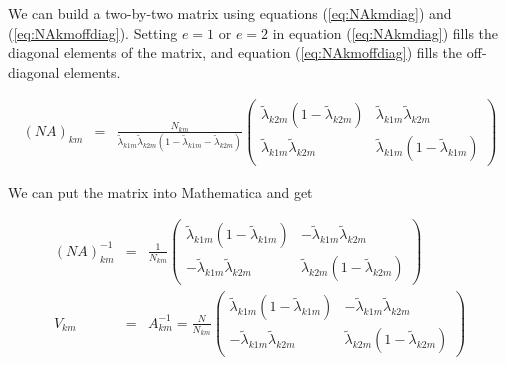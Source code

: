 \documentclass[11pt]{article}
\begin{document}
We can build a two-by-two matrix using equations (\ref{eq:NAkmdiag})
and (\ref{eq:NAkmoffdiag}).  Setting $e=1$ or $e=2$ in equation
(\ref{eq:NAkmdiag}) fills the diagonal elements of the matrix, and
equation (\ref{eq:NAkmoffdiag}) fills the off-diagonal elements. 



\begin{eqnarray}
(NA)_{km} & = &
                                 \frac{N_{km}}{ \tilde{\lambda}_{k1m} \tilde{\lambda}_{k2m} 
                                   (1-\tilde{\lambda}_{k1m}-\tilde{\lambda}_{k2m})
                                 }
                                 \left( \begin{array} {cc}
                                     \tilde{\lambda}_{k2m}(1-\tilde{\lambda}_{k2m}) & 
                                     \tilde{\lambda}_{k1m} \tilde{\lambda}_{k2m} \\
                                     \tilde{\lambda}_{k1m} \tilde{\lambda}_{k2m} &
                                     \tilde{\lambda}_{k1m}(1-\tilde{\lambda}_{k1m})
                                   \end{array} \right)
\end{eqnarray}

We can put the matrix into Mathematica and get 

\begin{eqnarray}
(NA)_{km}^{-1} & = & 
                          \frac{1}{N_{km}}
                          \left( 
                          \begin{array} {cc}
                            \tilde{\lambda}_{k1m} (1-\tilde{\lambda}_{k1m})&
                            -\tilde{\lambda}_{k1m} \tilde{\lambda}_{k2m}\\
                            -\tilde{\lambda}_{k1m} \tilde{\lambda}_{k2m}&
                            \tilde{\lambda}_{k2m} (1-\tilde{\lambda}_{k2m})
                          \end{array}
                        \right) \\
V_{km} & = & 
                         A_{km}^{-1} = \frac{N}{N_{km}}
                         \left( 
                         \begin{array} {cc}
                             \tilde{\lambda}_{k1m} (1-\tilde{\lambda}_{k1m})&
                             -\tilde{\lambda}_{k1m} \tilde{\lambda}_{k2m}\\
                             -\tilde{\lambda}_{k1m} \tilde{\lambda}_{k2m}&
                               \tilde{\lambda}_{k2m} (1-\tilde{\lambda}_{k2m})
                           \end{array} 
                         \right) \label{eq:Vkm}
\end{eqnarray}
\end{document}
